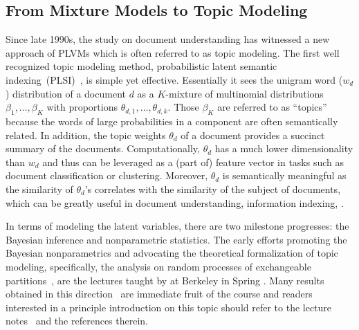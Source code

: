 \subsection{From Mixture Models to Topic Modeling}

Since late 1990s, the study on document understanding has witnessed a new
approach of PLVMs which is often referred to as topic modeling. The first well
recognized topic modeling method, probabilistic latent semantic
indexing~(PLSI)~\cite{hofmann1999probabilistic}, is simple yet effective.
Essentially it sees the unigram word ($w_d$) distribution of a document $d$ as a
$K$-mixture of multinomial distributions $\beta_1, \dots, \beta_K$ with
proportions $\theta_{d, 1}, \dots, \theta_{d, k}$. Those $\beta_K$ are referred
to as ``topics'' because the words of large probabilities in a component are
often semantically related. In addition, the topic weights $\theta_d$ of a
document provides a succinct summary of the documents. Computationally,
$\theta_d$ has a much lower dimensionality than $w_d$ and thus can be leveraged
as a (part of) feature vector in tasks such as document classification or
clustering. Moreover, $\theta_d$ is semantically meaningful as the similarity of
$\theta_d$'s correlates with the similarity of the subject of documents, which
can be greatly useful in document understanding, information indexing, \etc.

In terms of modeling the latent variables, there are two milestone progresses:
the Bayesian inference and nonparametric statistics. The early efforts promoting
the Bayesian nonparametrics and advocating the theoretical formalization of
topic modeling, specifically, the analysis on random processes of exchangeable
partitions~\cite{pitman1995exchangeable}, are the lectures taught by
\citeauthor{pitman2002combinatorial} at Berkeley in Spring
\citeyear{pitman2002combinatorial}. Many results obtained in this
direction~\cite{blei2009topic,blei2003latent,blei2010nested} are immediate fruit
of the course and readers interested in a principle introduction on this topic
should refer to the lecture notes~\cite{pitman2002combinatorial} and the
references therein.

